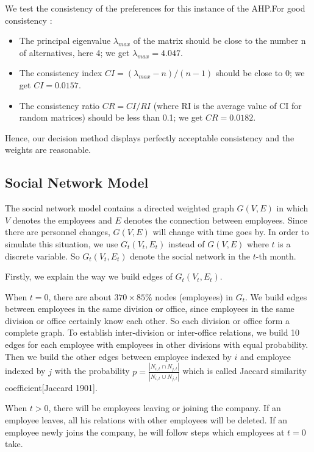 \documentclass[12pt,a4paper,titlepage]{article}
\begin{document}
We test the consistency of the preferences for this instance of the
AHP.\@ For good consistency \cite{4}:

\begin{itemize}
\item The principal eigenvalue $\lambda_{max}$ of the matrix should be
  close to the number n of alternatives, here 4; we get $\lambda_{max} = 4.047$.
\item The consistency index $CI = (\lambda_{max}-n)/(n-1)$ should be close to 0; we get $CI = 0.0157$.
\item The consistency ratio $CR = CI/RI$ (where RI is the average
  value of CI for random matrices) should be less than 0.1; we get $CR
  = 0.0182$.
\end{itemize}

Hence, our decision method displays perfectly acceptable consistency
and the weights are reasonable.

\subsection{Social Network Model}
\label{sec:social-network-model}

The social network model contains a directed weighted graph $G(V,E)$
in which $V$ denotes the employees and $E$ denotes the connection
between employees. Since there are personnel changes, $G(V,E)$ will
change with time goes by. In order to simulate this situation, we use
$G_t(V_t,E_t)$ instead of $G(V,E)$ where $t$ is a discrete
variable. So $G_t(V_t,E_t)$ denote the social network in the $t$-th
month.

Firstly, we explain the way we build edges of $G_t(V_t,E_t)$.

When $t = 0$, there are about $370 \times 85\%$ nodes (employees) in
$G_t$. We build edges between employees in the same division or
office, since employees in the same division or office certainly know
each other. So each division or office form a complete graph. To establish inter-division or inter-office relations, we build 10 edges for each
employee with employees in other divisions with equal
probability. Then we build the other edges between employee indexed by
$i$ and employee indexed by $j$ with the probability
$p = \frac{\left|N_{i,t} \cap N_{j,t}\right|}{\left|N_{i,t} \cup
    N_{j,t}\right|}$
which is called Jaccard similarity coefficient[Jaccard 1901].

When $t > 0$, there will be employees leaving or joining the
company. If an employee leaves, all his relations with other employees will
be deleted. If an employee newly joins the company, he will follow
steps which employees at $t = 0$ take.
\end{document}
